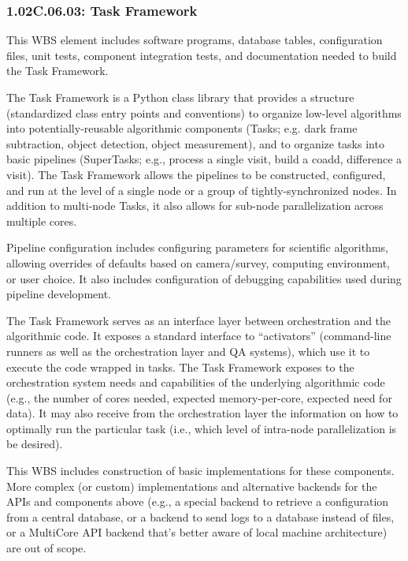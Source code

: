 \subsubsection*{1.02C.06.03: Task Framework}

This WBS element includes software programs, database tables, configuration files, unit tests, component integration tests, and documentation needed to build the Task Framework.

The Task Framework is a Python class library that provides a structure (standardized class entry points and conventions) to organize low-level algorithms into potentially-reusable algorithmic components (Tasks; e.g. dark frame subtraction, object detection, object measurement), and to organize tasks into basic pipelines (SuperTasks; e.g., process a single visit, build a coadd, difference a visit). The Task Framework allows the pipelines to be constructed, configured, and run at the level of a single node or a group of tightly-synchronized nodes. In addition to multi-node Tasks, it also allows for sub-node parallelization across multiple cores.

Pipeline configuration includes configuring parameters for scientific algorithms, allowing overrides of defaults based on camera/survey, computing environment, or user choice.  It also includes configuration of debugging capabilities used during pipeline development.

The Task Framework serves as an interface layer between orchestration and the algorithmic code. It exposes a standard interface to ``activators'' (command-line runners as well as the orchestration layer and QA systems), which use it to execute the code wrapped in tasks. The Task Framework exposes to the orchestration system needs and capabilities of the underlying algorithmic code (e.g., the number of cores needed, expected memory-per-core, expected need for data). It may also receive from the orchestration layer the information on how to optimally run the particular task (i.e., which level of intra-node parallelization is be desired).

This WBS includes construction of basic implementations for these components.  More complex (or custom) implementations and alternative backends for the APIs and components above (e.g., a special backend to retrieve a configuration from a central database, or a backend to send logs to a database instead of files, or a MultiCore API backend that's better aware of local machine architecture) are out of scope.
